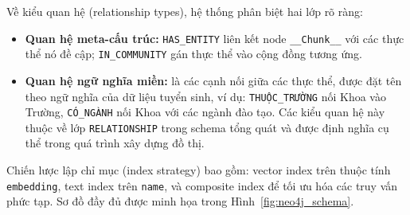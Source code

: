 \documentclass[12pt,a4paper]{report}
\theoremstyle{plain}
\theoremstyle{definition}
\begin{document}
	Về kiểu quan hệ (relationship types), hệ thống phân biệt hai lớp rõ ràng:
	\begin{itemize}
		\item \textbf{Quan hệ meta-cấu trúc:} \texttt{HAS\_ENTITY} liên kết node
		\texttt{\_\_Chunk\_\_} với các thực thể nó đề cập; \texttt{IN\_COMMUNITY}
		gán thực thể vào cộng đồng tương ứng.
		\item \textbf{Quan hệ ngữ nghĩa miền:} là các cạnh nối giữa các thực thể,
		được đặt tên theo ngữ nghĩa của dữ liệu tuyển sinh, ví dụ:
		\texttt{THUỘC\_TRƯỜNG} nối Khoa vào Trường, \texttt{CÓ\_NGÀNH} nối Khoa
		với các ngành đào tạo. Các kiểu quan hệ này thuộc về lớp \texttt{RELATIONSHIP}
		trong schema tổng quát và được định nghĩa cụ thể trong quá trình xây dựng đồ thị.
	\end{itemize}
	
	Chiến lược lập chỉ mục (index strategy) bao gồm: vector index trên thuộc
	tính \texttt{embedding}, text index trên \texttt{name}, và composite index
	để tối ưu hóa các truy vấn phức tạp. Sơ đồ đầy đủ được minh họa trong
	Hình~\ref{fig:neo4j_schema}.
	
\end{document}
